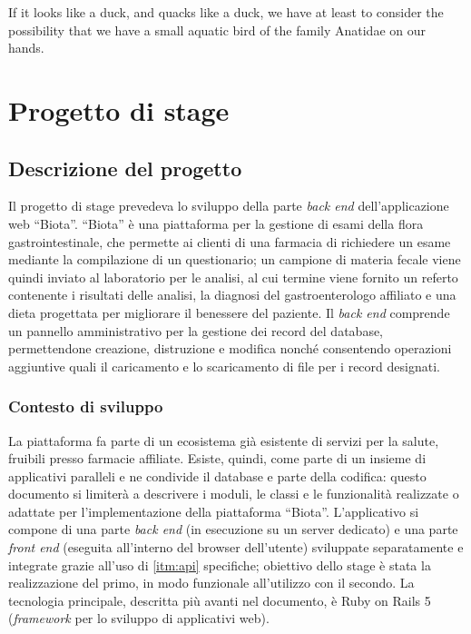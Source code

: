 
\begin{savequote}[75mm]
    If it looks like a duck, and quacks like a duck, we have at least to consider the possibility that we have a small aquatic bird of the family Anatidae on our hands.
\end{savequote}
\chapter{Progetto di stage}

\section{Descrizione del progetto}
Il progetto di stage prevedeva lo sviluppo della parte \textit{back end} dell'applicazione web ``Biota''. ``Biota'' è una piattaforma per la gestione di esami della flora gastrointestinale, che permette ai clienti di una farmacia di richiedere un esame mediante la compilazione di un questionario; un campione di materia fecale viene quindi inviato al laboratorio per le analisi, al cui termine viene fornito un referto contenente i risultati delle analisi, la diagnosi del gastroenterologo affiliato e una dieta progettata per migliorare il benessere del paziente. Il \textit{back end} comprende un pannello amministrativo per la gestione dei record del database, permettendone creazione, distruzione e modifica nonché consentendo operazioni aggiuntive quali il caricamento e lo scaricamento di file per i record designati.

\subsection{Contesto di sviluppo}
\label{sec:devctx}
La piattaforma fa parte di un ecosistema già esistente di servizi per la salute, fruibili presso farmacie affiliate. Esiste, quindi, come parte di un insieme di applicativi paralleli e ne condivide il database e parte della codifica: questo documento si limiterà a descrivere i moduli, le classi e le funzionalità realizzate o adattate per l'implementazione della piattaforma ``Biota''.
L'applicativo si compone di una parte \textit{back end} (in esecuzione su un server dedicato) e una parte \textit{front end} (eseguita all'interno del browser dell'utente) sviluppate separatamente e integrate grazie all'uso di \ref{itm:api} specifiche; obiettivo dello stage è stata la realizzazione del primo, in modo funzionale all'utilizzo con il secondo. La tecnologia principale, descritta più avanti nel documento, è Ruby on Rails 5 (\textit{framework} per lo sviluppo di applicativi web).


